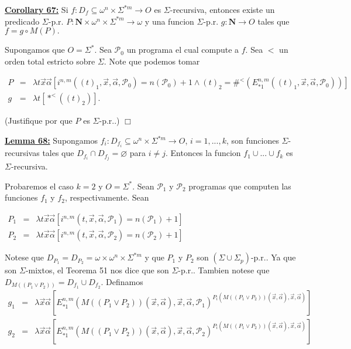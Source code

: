 \textbf{\underline{Corollary 67:}} Si \(f:D_{f}\subseteq \omega ^{n}\times \Sigma ^{\ast m}\rightarrow O\) es \( \Sigma \)-recursiva, entonces existe un predicado \(\Sigma \)-p.r. \(P:\mathbf{N} \times \omega ^{n}\times \Sigma ^{\ast m}\rightarrow \omega \) y una funcion \( \Sigma \)-p.r. \(g:\mathbf{N}\rightarrow O\) tales que \(f=g\circ M(P).\)

\PROOF Supongamos que \(O=\Sigma ^{\ast }\). Sea \(\mathcal{P}_{0}\) un programa el cual compute a \(f\). Sea \(< \) un orden total estricto sobre \(\Sigma \). Note que podemos tomar

\(\displaystyle \begin{array}{rcl} P & =& \lambda t\vec{x}\vec{\alpha}[i^{n,m}\left( (t)_{1},\vec{x},\vec{\alpha}, \mathcal{P}_{0}\right) =n(\mathcal{P}_{0})+1\wedge (t)_{2}=\#^{< }(E_{\ast 1}^{n,m}((t)_{1},\vec{x},\vec{\alpha},\mathcal{P}_{0}))] \\ g & =& \lambda t\left[ \ast ^{< }((t)_{2})\right] \text{.} \end{array} \)

(Justifique por que \(P\) es \(\Sigma \)-p.r..) \(\Box\)


\textbf{\underline{Lemma 68:}} Supongamos \(f_{i}:D_{f_{i}}\subseteq \omega ^{n}\times \Sigma ^{\ast m}\rightarrow O\), \(i=1,...,k\), son funciones \(\Sigma \)-recursivas tales que \(D_{f_{i}}\cap D_{f_{j}}=\varnothing \) para \(i\neq j\). Entonces la funcion \(f_{1}\cup ...\cup f_{k}\) es \(\Sigma \)-recursiva.

\PROOF Probaremos el caso \(k=2\) y \(O=\Sigma ^{\ast }\). Sean \(\mathcal{P}_{1}\) y \( \mathcal{P}_{2}\) programas que computen las funciones \(f_{1}\) y \(f_{2}\), respectivamente. Sean

\(\displaystyle \begin{array}{rcl} P_{1} & =& \lambda t\vec{x}\vec{\alpha}\left[ i^{n,m}(t,\vec{x},\vec{\alpha}, \mathcal{P}_{1})=n(\mathcal{P}_{1})+1\right] \\ P_{2} & =& \lambda t\vec{x}\vec{\alpha}\left[ i^{n,m}(t,\vec{x},\vec{\alpha}, \mathcal{P}_{2})=n(\mathcal{P}_{2})+1\right] \end{array} \)

Notese que \(D_{P_{1}}=D_{P_{2}}=\omega \times \omega ^{n}\times \Sigma ^{\ast m}\) y que \(P_{1}\) y \(P_{2}\) son \((\Sigma \cup \Sigma _{p})\)-p.r.. Ya que son \(\Sigma \)-mixtos, el Teorema 51 nos dice que son \( \Sigma \)-p.r.. Tambien notese que \(D_{M((P_{1}\vee P_{2}))}=D_{f_{1}}\cup D_{f_{2}}\). Definamos
\(\displaystyle \begin{array}{rcl} g_{1} & =& \lambda \vec{x}\vec{\alpha}\left[ E_{\ast 1}^{n,m}(M\left( (P_{1}\vee P_{2})\right) (\vec{x},\vec{\alpha}),\vec{x},\vec{\alpha}, \mathcal{P}_{1})^{P_{i}(M\left( (P_{1}\vee P_{2})\right) (\vec{x},\vec{\alpha }),\vec{x},\vec{\alpha})}\right] \\ g_{2} & =& \lambda \vec{x}\vec{\alpha}\left[ E_{\ast 1}^{n,m}(M\left( (P_{1}\vee P_{2})\right) (\vec{x},\vec{\alpha}),\vec{x},\vec{\alpha}, \mathcal{P}_{2})^{P_{i}(M\left( (P_{1}\vee P_{2})\right) (\vec{x},\vec{\alpha }),\vec{x},\vec{\alpha})}\right] \end{array} \)

